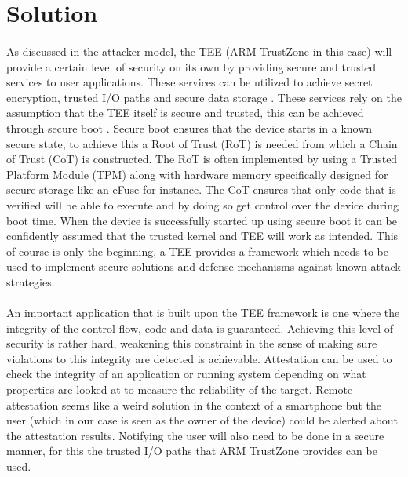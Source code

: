 \documentclass{report}
\begin{document}
\section{Solution}

\paragraph*{}
As discussed in the attacker model, the TEE (ARM TrustZone in this case) will provide a certain level of security on its own by providing secure and trusted services to user applications. These services can be utilized to achieve secret encryption, trusted I/O paths and secure data storage \cite{PintoSandro2019DATA}. These services rely on the assumption that the TEE itself is secure and trusted, this can be achieved through secure boot \cite{JiangHang2017IaAS}. Secure boot ensures that the device starts in a known secure state, to achieve this a Root of Trust (RoT) is needed from which a Chain of Trust (CoT) is constructed. The RoT is often implemented by using a Trusted Platform Module (TPM) along with hardware memory specifically designed for secure storage like an eFuse for instance. The CoT ensures that only code that is verified will be able to execute and by doing so get control over the device during boot time. When the device is successfully started up using secure boot it can be confidently assumed that the trusted kernel and TEE will work as intended. This of course is only the beginning, a TEE provides a framework which needs to be used to implement secure solutions and defense mechanisms against known attack strategies. 

\paragraph*{}
An important application that is built upon the TEE framework is one where the integrity of the control flow, code and data is guaranteed. Achieving this level of security is rather hard, weakening this constraint in the sense of making sure violations to this integrity are detected is achievable. Attestation can be used to check the integrity of an application or running system depending on what properties are looked at to measure the reliability of the target. Remote attestation seems like a weird solution in the context of a smartphone but the user (which in our case is seen as the owner of the device) could be alerted about the attestation results. Notifying the user will also need to be done in a secure manner, for this the trusted I/O paths that ARM TrustZone provides can be used. 
\end{document}
